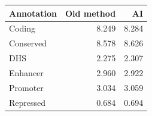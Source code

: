 \begin{tabular}{lrr}
\toprule
Annotation & Old method & AI \\
\midrule
Coding & 8.249 & 8.284 \\
Conserved & 8.578 & 8.626 \\
DHS & 2.275 & 2.307 \\
Enhancer & 2.960 & 2.922 \\
Promoter & 3.034 & 3.059 \\
Repressed & 0.684 & 0.694 \\
\bottomrule
\end{tabular}
